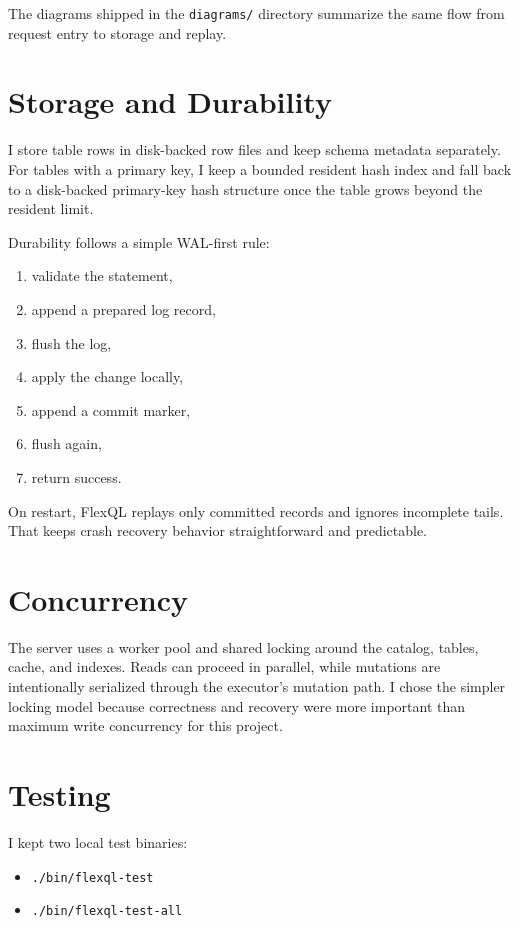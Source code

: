\documentclass[11pt,a4paper]{article}
\begin{document}
The diagrams shipped in the \texttt{diagrams/} directory summarize the same flow from request entry to storage and replay.

\section{Storage and Durability}

I store table rows in disk-backed row files and keep schema metadata separately. For tables with a primary key, I keep a bounded resident hash index and fall back to a disk-backed primary-key hash structure once the table grows beyond the resident limit.

Durability follows a simple WAL-first rule:

\begin{enumerate}[leftmargin=1.5em]
    \item validate the statement,
    \item append a prepared log record,
    \item flush the log,
    \item apply the change locally,
    \item append a commit marker,
    \item flush again,
    \item return success.
\end{enumerate}

On restart, FlexQL replays only committed records and ignores incomplete tails. That keeps crash recovery behavior straightforward and predictable.

\section{Concurrency}

The server uses a worker pool and shared locking around the catalog, tables, cache, and indexes. Reads can proceed in parallel, while mutations are intentionally serialized through the executor's mutation path. I chose the simpler locking model because correctness and recovery were more important than maximum write concurrency for this project.

\section{Testing}

I kept two local test binaries:

\begin{itemize}[leftmargin=1.5em]
    \item \texttt{./bin/flexql-test}
    \item \texttt{./bin/flexql-test-all}
\end{itemize}
\end{document}
